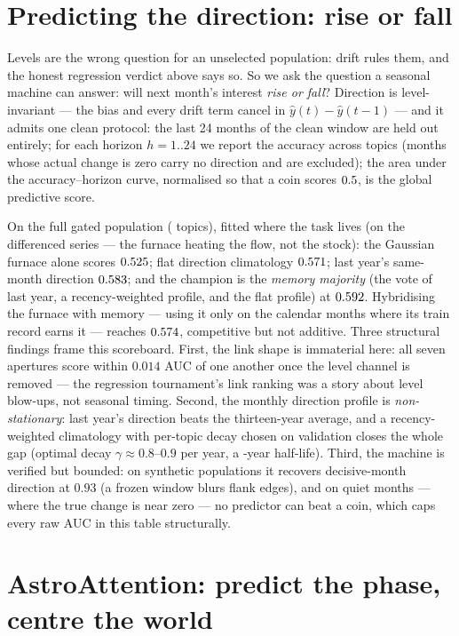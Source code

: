 \documentclass[11pt]{artaquest}
\begin{document}
\section{Predicting the direction: rise or fall}

Levels are the wrong question for an unselected population: drift rules them, and the honest
regression verdict above says so. So we ask the question a seasonal machine can answer: will
next month's interest \emph{rise or fall}? Direction is level-invariant --- the bias and every
drift term cancel in $\hat{y}(t)-\hat{y}(t-1)$ --- and it admits one clean protocol: the last 24
months of the clean window are held out entirely; for each horizon $h = 1..24$ we report the
accuracy across topics (months whose actual change is zero carry no direction and are excluded);
the area under the accuracy--horizon curve, normalised so that a coin scores $0.5$, is the
global predictive score.

On the full gated population (\nTopicsDir{} topics), fitted where the task lives (on the
differenced series --- the furnace heating the flow, not the stock):
the Gaussian furnace alone scores $0.525$; flat direction climatology $0.571$;
last year's same-month direction $0.583$; and the champion is the \emph{memory majority}
(the vote of last year, a recency-weighted profile, and the flat profile) at $0.592$.
Hybridising the furnace with memory --- using it only on the calendar months where its train
record earns it --- reaches $0.574$, competitive but not additive. Three structural findings
frame this scoreboard. First, the link shape is immaterial here: all seven apertures score
within $0.014$ AUC of one another once the level channel is removed --- the regression
tournament's link ranking was a story about level blow-ups, not seasonal timing. Second, the
monthly direction profile is \emph{non-stationary}: last year's direction beats the thirteen-year
average, and a recency-weighted climatology with per-topic decay chosen on validation closes the
whole gap (optimal decay $\gamma \approx 0.8$--$0.9$ per year, a \gammaHalfLife{}-year
half-life). Third, the machine is verified but bounded: on synthetic populations it recovers
decisive-month direction at $0.93$ (a frozen window blurs flank edges), and on quiet months ---
where the true change is near zero --- no predictor can beat a coin, which caps every raw AUC in
this table structurally.

\section{AstroAttention: predict the phase, centre the world}
\end{document}

